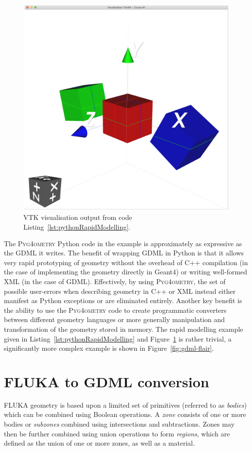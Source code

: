 \documentclass[final,5p,times,twocolumn]{elsarticle}
\newcommand{\PYGEOMETRY}{\textsc{Pyg4ometry}}
\begin{document}
\begin{figure}[htbp]
\begin{center}
\includegraphics[width=0.9\columnwidth]{./diagrams/rapidModelling.pdf}
\caption{VTK visualisation output from code Listing~\ref{lst:pythonRapidModelling}.}
\label{fig:rapidModellingExample}
\end{center}
\end{figure}

The \PYGEOMETRY{} Python code in the example is approximately as expressive
as the GDML it writes. The benefit of wrapping GDML in Python is that it allows
 very rapid prototyping of geometry without the overhead of C++ compilation  (in the
case of implementing the geometry directly in Geant4) or writing well-formed XML (in the case of GDML). Effectively,
by using \PYGEOMETRY{}, the set of possible user-errors when describing geometry in C++ or XML
instead either manifest as Python exceptions or are eliminated entirely.
Another key benefit is the ability to use the \PYGEOMETRY{} code to create
programmatic converters between different geometry languages or more generally
manipulation and transformation of the geometry stored in memory. The rapid modelling
example given in Listing~\ref{lst:pythonRapidModelling} and Figure~\ref{fig:rapidModellingExample}
is rather trivial, a significantly more complex example is shown in Figure~\ref{fig:gdml-flair}.

\section{FLUKA to GDML conversion}
FLUKA geometry is based upon a limited set of primitives (referred to as
\emph{bodies}) which can be combined using Boolean operations. A
\emph{zone} consists of one or more bodies or \emph{subzones} combined
using intersections and subtractions.  Zones may then be further combined
using union operations to form \emph{regions}, which are defined as the
union of one or more zones, as well as a material.
\end{document}
